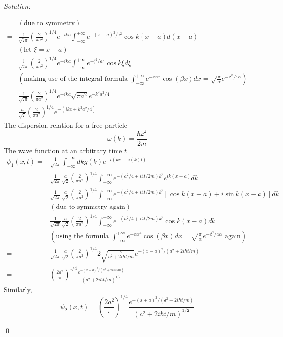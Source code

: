 \documentclass[12pt]{article}
\newenvironment{sol}
    {\emph{Solution:}
    }
    {
    \qed
    }
\begin{document}
\begin{sol}
\begin{align}
\nonumber&(\text{due to symmetry})\\
\nonumber=&\frac{1}{\sqrt{2\pi}}(\frac{2}{\pi a^2})^{1/4}e^{-ika}\int_{-\infty}^{+\infty}e^{-(x-a)^2/a^2}\cos k(x-a)d(x-a)\\
\nonumber&(\text{let }\xi=x-a)\\
\nonumber=&\frac{1}{\sqrt{2\pi}}(\frac{2}{\pi a^2})^{1/4}e^{-ika}\int_{-\infty}^{+\infty}e^{-\xi^2/a^2}\cos k\xi d\xi\\
\nonumber&(\text{making use of the integral formula }\int_{-\infty}^{+\infty}e^{-\alpha x^2}\cos(\beta x)dx=\sqrt{\frac{\pi}{\alpha}}e^{-\beta^2/4\alpha})\\
\nonumber=&\frac{1}{\sqrt{2\pi}}(\frac{2}{\pi a^2})^{1/4}e^{-ika}\sqrt{\pi a^2}e^{-k^2a^2/4}\\
=&\frac{a}{\sqrt{2}}(\frac{2}{\pi a^2})^{1/4}e^{-(ika+k^2a^2/4)}
\end{align}
The dispersion relation for a free particle
\begin{equation}
\omega(k)=\frac{\hbar k^2}{2m}
\end{equation}
The wave function at an arbitrary time $t$
\begin{align}
\nonumber\psi_1(x,t)=&\frac{1}{\sqrt{2\pi}}\int_{-\infty}^{+\infty}dkg(k)e^{-i(kx-\omega(k)t)}\\
\nonumber=&\frac{1}{\sqrt{2\pi}}\frac{a}{\sqrt{2}}(\frac{2}{\pi a^2})^{1/4}\int_{-\infty}^{+\infty}e^{-(a^2/4+i\hbar t/2m)k^2}e^{ik(x-a)}dk\\
\nonumber=&\frac{1}{\sqrt{2\pi}}\frac{a}{\sqrt{2}}(\frac{2}{\pi a^2})^{1/4}\int_{-\infty}^{+\infty}e^{-(a^2/4+i\hbar t/2m)k^2}[\cos k(x-a)+i\sin k(x-a)]dk\\
\nonumber&(\text{due to symmetry again})\\
\nonumber=&\frac{1}{\sqrt{2\pi}}\frac{a}{\sqrt{2}}(\frac{2}{\pi a^2})^{1/4}\int_{-\infty}^{+\infty}e^{-(a^2/4+i\hbar t/2m)k^2}\cos k(x-a)dk\\
\nonumber&(\text{using the formula }\int_{-\infty}^{+\infty}e^{-\alpha x^2}\cos(\beta x)dx=\sqrt{\frac{\pi}{\alpha}}e^{-\beta^2/4\alpha}\text{ again})\\
\nonumber=&\frac{1}{\sqrt{2\pi}}\frac{a}{\sqrt{2}}(\frac{2}{\pi a^2})^{1/4}2\sqrt{\frac{\pi}{a^2+2i\hbar t/m}}e^{-(x-a)^2/(a^2+2i\hbar t/m)}\\
=&(\frac{2a^2}{\pi})^{1/4}\frac{e^{-(x-a)^2/(a^2+2i\hbar t/m)}}{(a^2+2i\hbar t/m)^{1/2}}
\end{align}
Similarly,
\begin{equation}
\psi_2(x,t)=(\frac{2a^2}{\pi})^{1/4}\frac{e^{-(x+a)^2/(a^2+2i\hbar t/m)}}{(a^2+2i\hbar t/m)^{1/2}}

\end{equation}
\end{sol}
\end{document}
